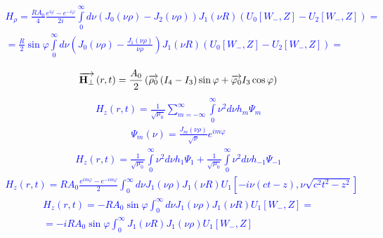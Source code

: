 %
\textcolor{blue} { \begin{equation*} \begin{aligned}
H_\rho = \frac{R A_0}{4} \frac{e^{i \varphi} - e^{- i \varphi}}{2i}
\int \limits_{0}^{\infty} d \nu (J_{0}(\nu \rho) - J_{2}(\nu \rho))
J_1(\nu R) (U_0[ W_-, Z ] - U_2[ W_-, Z ]) = \\
= \frac{R}{2} \sin \varphi \int \limits_{0}^{\infty} d \nu 
(J_0(\nu \rho) - \frac{J_1(\nu \rho)}{\nu \rho})
J_1(\nu R) (U_0[ W_-, Z ] - U_2[ W_-, Z ]) = \\
\end{aligned} \end{equation*} }
%
\textcolor{blue} { \begin{equation*} \begin{aligned}
\overrightarrow{\mathbf H_\perp} \left( r, t \right) = \frac{A_0}{2} \left( 
\overrightarrow{\mathbf \rho_0} \left( I_4 - I_3 \right) \sin \varphi +
\overrightarrow{\mathbf \varphi_0} I_3 \cos \varphi  \right)
\end{aligned} \end{equation*} }
%
\textcolor{blue} { \begin{equation*} \begin{aligned}
H_z (r,t) = \frac{1}{\sqrt{\mu_0}} \sum \limits_{m=-\infty}^{\infty}
\int \limits_0^\infty \nu^2 d \nu h_m \Psi_m
\end{aligned} \end{equation*} }
%
\textcolor{blue} { \begin{equation*} \begin{aligned}
\Psi_m (\nu) = \frac{J_m(\nu \rho)}{\sqrt{\nu}} e^{im \varphi} 
\end{aligned} \end{equation*} }
%
\textcolor{blue} { \begin{equation*} \begin{aligned}
H_z (r,t) = 
\frac{1}{\sqrt{\mu_0}} \int \limits_0^\infty \nu^2 d \nu h_{1} \Psi_{1} +
\frac{1}{\sqrt{\mu_0}} \int \limits_0^\infty \nu^2 d \nu h_{-1} \Psi_{-1}
\end{aligned} \end{equation*} }
%
\textcolor{blue} { \begin{equation*} \begin{aligned}
H_z (r,t) = R A_0 \frac{e^{im \varphi}-e^{-im \varphi}}{2} \int_0^\infty 
d \nu J_1(\nu \rho) J_1 (\nu R)
U_1 \left[ -i \nu (ct-z), \nu \sqrt{c^2t^2-z^2} \right]
\end{aligned} \end{equation*} }
%
\textcolor{blue} { \begin{equation*} \begin{aligned}
H_z (r,t) = - R A_0 \sin \varphi \int_0^\infty 
d \nu J_1(\nu \rho) J_1 (\nu R) U_1 [ W_-, Z ] = \\
= - i R A_0 \sin \varphi \int_{0}^{\infty} J_1 \left( \nu R \right)
J_1 \left( \nu \rho \right) U_1 [ W_-, Z ]
\end{aligned} \end{equation*} }
